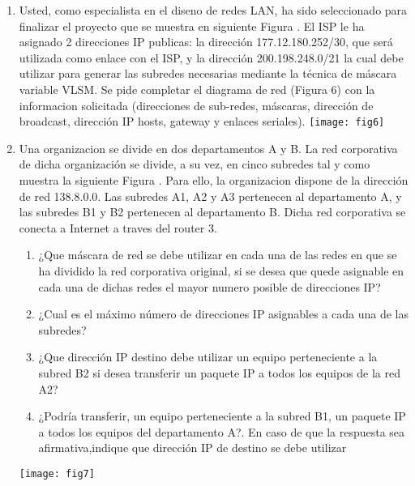 \documentclass{udparticle}
\begin{document}
\begin{enumerate}
\item Usted, como especialista en el diseno de redes LAN, ha sido seleccionado para
finalizar el proyecto que se muestra en siguiente  Figura . El ISP le ha asignado 2 
direcciones IP publicas: la dirección 177.12.180.252/30, que será utilizada como 
enlace con el ISP, y la dirección 200.198.248.0/21 la cual debe utilizar para generar las subredes necesarias mediante la técnica de máscara variable VLSM.
Se pide completar el diagrama de red (Figura 6) con la informacion solicitada
(direcciones de sub-redes, máscaras, dirección de broadcast, dirección IP 
hosts, gateway y enlaces seriales).
\texttt{[image: fig6]}
\item Una organizacion se divide en dos departamentos A y B. La red corporativa de 
dicha organización se divide, a su vez, en cinco subredes tal y como muestra la siguiente
Figura . Para ello, la organizacion dispone de la dirección de red 138.8.0.0. 
Las subredes A1, A2 y A3 pertenecen al departamento A, y las subredes B1 y B2 
pertenecen al departamento B. Dicha red corporativa se conecta a Internet    a traves 
del router 3.
\begin{enumerate}
\item ¿Que máscara de red se debe utilizar en cada una de las redes en que se ha dividido la red corporativa original, si se desea que quede asignable en 
cada una de dichas redes el mayor numero posible de direcciones IP?
\item¿Cual es el máximo número de direcciones IP asignables a cada una de las subredes?
\item ¿Que dirección IP destino debe utilizar un equipo perteneciente a la 
subred B2 si desea transferir un paquete IP a todos los equipos de la red 
A2?
\item ¿Podría transferir, un equipo perteneciente a la subred B1, un paquete 
IP a todos los equipos del departamento A?. En caso de que la respuesta sea afirmativa,indique que dirección IP de destino se debe utilizar\\
\end{enumerate}
\texttt{[image: fig7]}




\end{enumerate}
\end{document}
